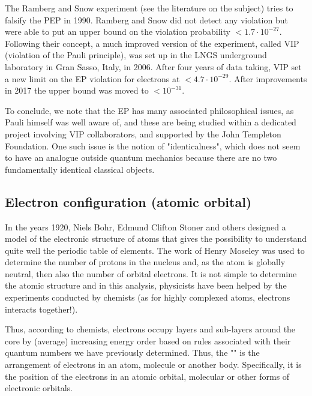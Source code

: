 	\begin{tcolorbox}[title=Remark,colframe=black,arc=10pt]
	The Ramberg and Snow experiment (see the literature on the subject) tries to falsify the PEP in 1990. Ramberg and Snow did not detect any violation but were able to put an upper bound on the violation probability $<1.7\cdot 10^{-27}$. Following their concept, a much improved version of the experiment, called VIP (violation of the Pauli principle), was set up in the LNGS underground laboratory in Gran Sasso, Italy, in 2006. After four years of data taking, VIP set a new limit on the EP violation for electrons at $<4.7\cdot 10^{-29}$. After improvements in 2017 the upper bound was moved to  $<10^{-31}$.
	\end{tcolorbox}
	
	To conclude, we note that the EP has many associated philosophical issues, as Pauli himself was well aware of, and these are being studied within a dedicated project involving VIP collaborators, and supported by the John Templeton Foundation. One such issue is the notion of "identicalness", which does not seem to have an analogue outside quantum mechanics because there are no two fundamentally identical classical objects.
	
	\subsection{Electron configuration (atomic orbital)}\label{electron configuration}
	In the years 1920, Niels Bohr, Edmund Clifton Stoner and others designed a model of the electronic structure of atoms that gives the possibility to understand quite well the periodic table of elements. The work of Henry Moseley was used to determine the number of protons in the nucleus and, as the atom is globally neutral, then also the number of orbital electrons. It is not simple to determine the atomic structure and in this analysis, physicists have been helped by the experiments conducted by chemists (as for highly complexed atoms, electrons interacts together!).

	Thus, according to chemists, electrons occupy layers and sub-layers around the core by (average) increasing energy order based on rules associated with their quantum numbers we have previously determined. Thus, the "" is the arrangement of electrons in an atom, molecule or another body. Specifically, it is the position of the electrons in an atomic orbital, molecular or other forms of electronic orbitals.
	
